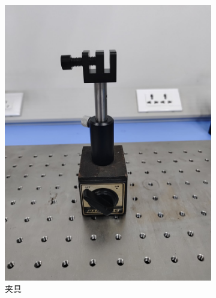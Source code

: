 \documentclass[a4paper]{report} %
\begin{document}
\begin{figure}[H]
\begin{subfigure}{0.22\textwidth}
        \includegraphics[width=\linewidth]{夹具1.jpg}
        \caption{夹具}
    \end{subfigure}
    \begin{subfigure}{0.22\textwidth}

\end{subfigure}
\end{figure}
\end{document}
